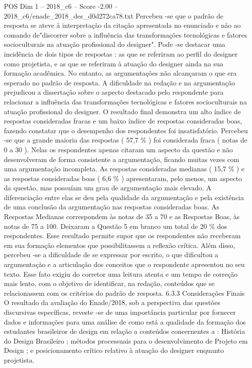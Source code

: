 \begin{textsample}{POS Dim 1 – 2018\_c6 – Score -2.00 – 2018\_c6/enade\_2018\_des\_d0d272ca78.txt}
Percebeu -se que o padrão de resposta se ateve à interpretação da citação apresentada no enunciado e não ao comando de"discorrer sobre a influência das transformações tecnológicas e fatores socioculturais na atuação profissional do designer".
Pode -se destacar uma incidência de dois tipos de respostas : as que se referiram ao perfil do designer como projetista, e as que se referiram à atuação do designer ainda na sua formação acadêmica.
No entanto, as argumentações não alcançaram o que era esperado no padrão de resposta.
A dificuldade na redação e na argumentação prejudicou a dissertação sobre o aspecto destacado pelo respondente para relacionar a influência das transformações tecnológicas e fatores socioculturais na atuação profissional do designer.
O resultado final demonstra um alto índice de respostas consideradas fracas e um baixo índice de respostas consideradas boas, fazendo constatar que o desempenho dos respondentes foi insatisfatório.
Percebeu -se que a grande maioria das respostas ( 57,7 \% ) foi considerada fraca ( notas de 0 a 30 ).
Nelas os respondentes apenas citaram um aspecto da questão e não desenvolveram de forma consistente a argumentação, ficando muitas vezes com uma argumentação incompleta.
As respostas consideradas medianas ( 15,7 \% ) e as respostas consideradas boas ( 6,6 \% ) apresentaram, pelo menos, um aspecto da questão, mas possuíam um grau de argumentação mais elevado.
A diferenciação entre elas se deu pela qualidade da argumentação e pela existência de uma conclusão da argumentação nas respostas consideradas boas.
As Respostas Medianas correspondem às notas de 35 a 70 e as Respostas Boas, às notas de 75 a 100.
Deixaram a Questão 5 em branco um total de 20 \% dos respondentes.
Esse resultado permite supor que os respondentes não receberam em sua formação elementos que possibilitassem a reflexão crítica.
Além disso, percebeu -se a dificuldade de se expressar por escrito, o que dificultou a argumentação e a articulação dos conceitos que o respondente apresentou no seu texto.
Esse fato exigiu do corretor uma leitura atenta e um tempo de correção mais lento, com o objetivo de identificar, na redação, conteúdos que se relacionassem com os critérios do padrão de resposta. 6.3.3 Considerações Finais O resultado da avaliação do Enade/2018, sob a perspectiva das questões discursivas específicas, reveste -se de uma importância particular por fornecer dados e informações para uma análise de como está a qualidade da formação dos estudantes brasileiros de design em relação a conteúdos concernentes a : História do Design Brasileiro ; métodos processuais para o desenvolvimento de Projeto em Design ; e posicionamento crítico relativo à atuação do designer enquanto projetista.

\end{textsample}
